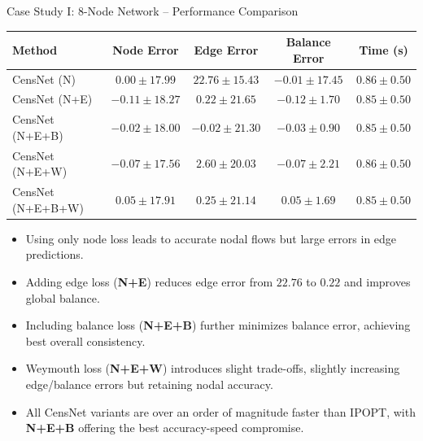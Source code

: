 \documentclass[hyperref={colorlinks,citecolor=blue,linkcolor=blue,urlcolor=blue}]{beamer}
\begin{document}
\begin{frame}{Case Study I: 8-Node Network -- Performance Comparison}
\scriptsize
\begin{table}
\captionsetup{font=scriptsize}  %
\hfill  %
\begin{tabular}{lcccc}
\toprule
\textbf{Method} & \textbf{Node Error} & \textbf{Edge Error} & \textbf{Balance Error} & \textbf{Time (s)} \\
\midrule
CensNet (N) & $0.00 \pm 17.99$ & $22.76 \pm 15.43$ & $-0.01 \pm 17.45$ & $0.86 \pm 0.50$ \\
CensNet (N+E) & $-0.11 \pm 18.27$ & $0.22 \pm 21.65$ & $-0.12 \pm 1.70$ & $0.85 \pm 0.50$ \\
CensNet (N+E+B) & $-0.02 \pm 18.00$ & $-0.02 \pm 21.30$ & $-0.03 \pm 0.90$ & $0.85 \pm 0.50$ \\
CensNet (N+E+W) & $-0.07 \pm 17.56$ & $2.60 \pm 20.03$ & $-0.07 \pm 2.21$ & $0.86 \pm 0.50$ \\
CensNet (N+E+B+W) & $0.05 \pm 17.91$ & $0.25 \pm 21.14$ & $0.05 \pm 1.69$ & $0.85 \pm 0.50$ \\
\bottomrule
\end{tabular}
\end{table}

\begin{itemize}
    \item Using only node loss leads to accurate nodal flows but large errors in edge predictions.
    \item Adding edge loss (\textbf{N+E}) reduces edge error from $22.76$ to $0.22$ and improves global balance.
    \item Including balance loss (\textbf{N+E+B}) further minimizes balance error, achieving best overall consistency.
    \item Weymouth loss (\textbf{N+E+W}) introduces slight trade-offs, slightly increasing edge/balance errors but retaining nodal accuracy.
    \item All CensNet variants are over an order of magnitude faster than IPOPT, with \textbf{N+E+B} offering the best accuracy-speed compromise.
\end{itemize}

\end{frame}
\end{document}
